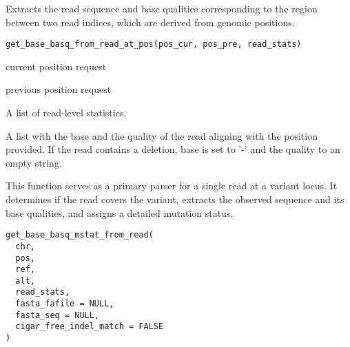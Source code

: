 \documentclass[a4paper]{book}
\begin{document}
%
\begin{Description}
Extracts the read sequence and base qualities corresponding to the region between two read indices,
which are derived from genomic positions.
\end{Description}
%
\begin{Usage}
\begin{verbatim}
get_base_basq_from_read_at_pos(pos_cur, pos_pre, read_stats)
\end{verbatim}
\end{Usage}
%
\begin{Arguments}
\begin{ldescription}
\item[\code{pos\_cur}] current position request

\item[\code{pos\_pre}] previous position request

\item[\code{read\_stats}] A list of read-level statistics.
\end{ldescription}
\end{Arguments}
%
\begin{Value}
A list with the base and the quality of the read aligning with the position provided. If the read contains a
deletion, base is set to '-' and the quality to an empty string.
\end{Value}
%
\begin{Description}
This function serves as a primary parser for a single read at a variant locus. It determines if the
read covers the variant, extracts the observed sequence and its base qualities, and assigns a detailed mutation status.
\end{Description}
%
\begin{Usage}
\begin{verbatim}
get_base_basq_mstat_from_read(
  chr,
  pos,
  ref,
  alt,
  read_stats,
  fasta_fafile = NULL,
  fasta_seq = NULL,
  cigar_free_indel_match = FALSE
)
\end{verbatim}
\end{Usage}
%
\end{document}
